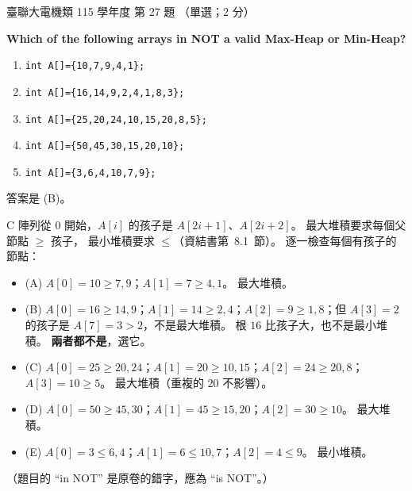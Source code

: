 \begin{pastexam}[label={px:ust-115-ee-ds-27}]{臺聯大電機類 115 學年度 第 27 題}
（單選；2 分）

\textbf{Which of the following arrays in NOT a valid Max-Heap or Min-Heap?}
\begin{enumerate}[label=(\Alph*)]
\item \texttt{int A[]=\{10,7,9,4,1\};}
\item \texttt{int A[]=\{16,14,9,2,4,1,8,3\};}
\item \texttt{int A[]=\{25,20,24,10,15,20,8,5\};}
\item \texttt{int A[]=\{50,45,30,15,20,10\};}
\item \texttt{int A[]=\{3,6,4,10,7,9\};}
\end{enumerate}
\end{pastexam}

\begin{pastsoln}
答案是 (B)。

C 陣列從 $0$ 開始，$A[i]$ 的孩子是 $A[2i+1]$、$A[2i+2]$。 最大堆積要求每個父節點 $\ge$ 孩子，
最小堆積要求 $\le$（資結書第~8.1~節）。 逐一檢查每個有孩子的節點：
\begin{itemize}
\item (A) $A[0] = 10 \ge 7, 9$；$A[1] = 7 \ge 4, 1$。 最大堆積。
\item (B) $A[0] = 16 \ge 14, 9$；$A[1] = 14 \ge 2, 4$；$A[2] = 9 \ge 1, 8$；但 $A[3] = 2$ 的孩子是
$A[7] = 3 > 2$，不是最大堆積。 根 $16$ 比孩子大，也不是最小堆積。 \textbf{兩者都不是}，選它。
\item (C) $A[0] = 25 \ge 20, 24$；$A[1] = 20 \ge 10, 15$；$A[2] = 24 \ge 20, 8$；$A[3] = 10 \ge 5$。
最大堆積（重複的 $20$ 不影響）。
\item (D) $A[0] = 50 \ge 45, 30$；$A[1] = 45 \ge 15, 20$；$A[2] = 30 \ge 10$。 最大堆積。
\item (E) $A[0] = 3 \le 6, 4$；$A[1] = 6 \le 10, 7$；$A[2] = 4 \le 9$。 最小堆積。
\end{itemize}
（題目的 ``in NOT'' 是原卷的錯字，應為 ``is NOT''。）
\end{pastsoln}
